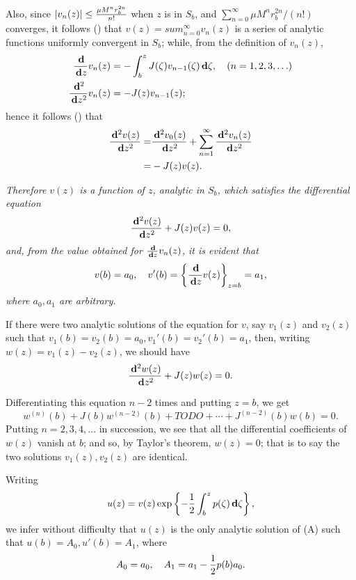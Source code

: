 Also, since $\left| v_{n}(z) \right| \leq \frac{\mu M^{n} r_{b}^{2n}}{n!}$ when $z$ is in $S_{b}$, and
$\sum_{n=0}^{\infty} \mu M^{n} r_{b}^{2n}/(n!)$ converges,
it follows () that
$v(z) = sum_{n=0}^{\infty} v_{n}(z)$ is a series of analytic functions
uniformly convergent in $S_{b}$; while, from the definition of $v_{n}(z)$,
\begin{align*}
  \frac{\, \mathbf{d}}{\, \mathbf{d} z} v_{n}(z)
  &= -\int_{b}^{z} J(\zeta) v_{n-1}(\zeta) \, \mathbf{d} \zeta,
  \quad (n = 1,2,3,\ldots)
  \\
  \frac{\, \mathbf{d}^{2}}{\, \mathbf{d} z^{2}} v_{n}(z)
  &= -J(z) v_{n-1}(z);
\end{align*}
hence it follows () that
\begin{align*}
  \frac{\, \mathbf{d}^{2} v(z)}{\, \mathbf{d} z^{2}}
  =&
  \frac{\, \mathbf{d}^{2} v_{0}(z)}{\, \mathbf{d} z^{2}}
  +
  \sum_{n=1}^{\infty} \frac{\, \mathbf{d}^{2} v_{n}(z)}{\, \mathbf{d} z^{2}}
  \\
  =&
  - J(z) v(z).
\end{align*}

\emph{Therefore $v(z)$ is a function of $z$, analytic in $S_{b}$, which satisfies
the differential equation
$$
\frac{\, \mathbf{d}^{2} v(z)}{\, \mathbf{d} z^{2}} + J(z) v(z) = 0,
$$
%
%
and, from the value obtained for
$\frac{\, \mathbf{d}}{\, \mathbf{d} z} v_{n}(z)$, it is evident that
$$
v(b) = a_{0},
\quad
v'(b) = \left\{ \frac{\, \mathbf{d}}{\, \mathbf{d} z}v(z) \right\}_{z=b} = a_{1},
$$
where $a_{0}, a_{1}$ are arbitrary.}


If there were two analytic solutions of the equation for $v$,
say $v_{1}(z)$ and $v_{2}(z)$ such that
$v_{1}(b) = v_{2}(b) = a_{0}, v_{1}'(b) = v_{2}'(b) = a_{1}$, then,
writing $w(z) = v_{1}(z) - v_{2}(z)$, we should have
$$
\frac{\, \mathbf{d}^{2} w(z)}{\, \mathbf{d} z^{2}} + J(z) w(z) = 0.
$$

Differentiating this equation $n-2$ times and putting $z = b$, we get
$$
w^{(n)}(b) + J(b) w^{(n-2)}(b) + TODO
+ \cdots + J^{(n-2)}(b) w(b) = 0.
$$
Putting $n = 2, 3, 4, \ldots$ in succession, we see that all the
differential coefficients of $w(z)$ vanish at $b$; and so, by Taylor's
theorem, $w(z) = 0$; that is to say the two solutions
$v_{1}(z), v_{2}(z)$ are identical.

Writing
$$
u(z) = v(z) \exp \left\{ 
  - \frac{1}{2} \int_{b}^{z} p(\zeta) \, \mathbf{d} \zeta
 \right\},
$$
we infer without difficulty that $u(z)$ is the only analytic solution
of (A) %
such that $u(b) = A_{0}, u'(b) = A_{1}$, where
$$
A_{0} = a_{0},
\quad
A_{1} = a_{1} - \frac{1}{2} p(b) a_{0}.
$$

